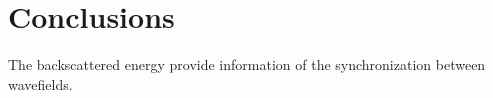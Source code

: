 \section{Conclusions}

The backscattered energy provide information 
of the synchronization between wavefields.


